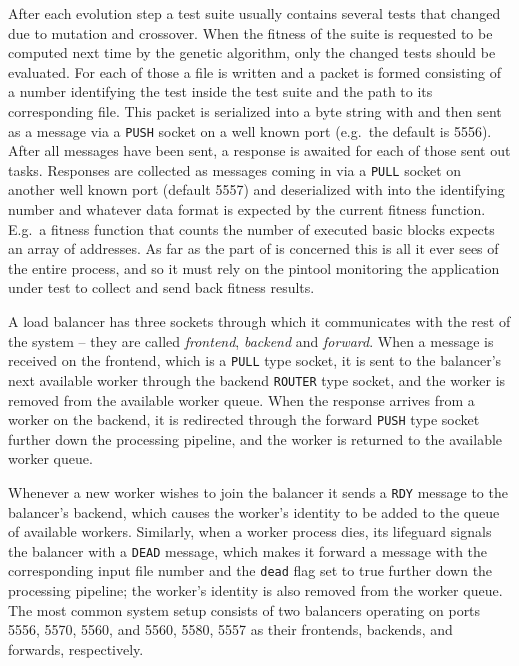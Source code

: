 After each evolution step a test suite usually contains several tests that changed due to mutation and
crossover. When the fitness of the suite is requested to be computed next time by the genetic algorithm, 
only the changed tests should be evaluated. For each of those a file is written and a packet is 
formed consisting of a number identifying the test inside the test suite and the path to its corresponding 
file. This packet is serialized into a byte string with \msgpack and then sent as a \zmq message via a 
\texttt{PUSH} socket on a well known port (e.g.\ the default is 5556). After all messages have been sent,
a response is awaited for each of those sent out tasks. Responses are collected as \zmq messages coming 
in via a \texttt{PULL} socket on another well known port (default 5557) and deserialized with \msgpack 
into the identifying number and whatever data format is expected by the current fitness function. 
E.g.\ a fitness function that counts the number of executed basic blocks expects an array of addresses.
As far as the \java part of \xmlmate is concerned this is all it ever sees of the entire process, and so it 
must rely on the pintool monitoring the application under test to collect and send back fitness results.

A load balancer has three \zmq sockets through which it communicates with the rest of the system -- they are
called \emph{frontend}, \emph{backend} and \emph{forward}. When a message is received on the frontend,
which is a \texttt{PULL} type socket, it is sent to the balancer's next available worker through
the backend \texttt{ROUTER} type socket, and the worker is removed from the available worker queue. When the
response arrives from a worker on the backend, it is redirected through the forward \texttt{PUSH} type socket
further down the processing pipeline, and the worker is returned to the available worker queue. 

Whenever a new worker wishes to join the balancer it sends a \texttt{RDY} message to the balancer's backend,
which causes the worker's identity to be added to the queue of available workers. Similarly, when a worker
process dies, its lifeguard signals the balancer with a \texttt{DEAD} message, which makes it forward a
message with the corresponding input file number and the \texttt{dead} flag set to true further down the
processing pipeline; the worker's identity is also removed from the worker queue. The most common system setup
consists of two balancers operating on ports 5556, 5570, 5560, and 5560, 5580, 5557 as their frontends,
backends, and forwards, respectively.

